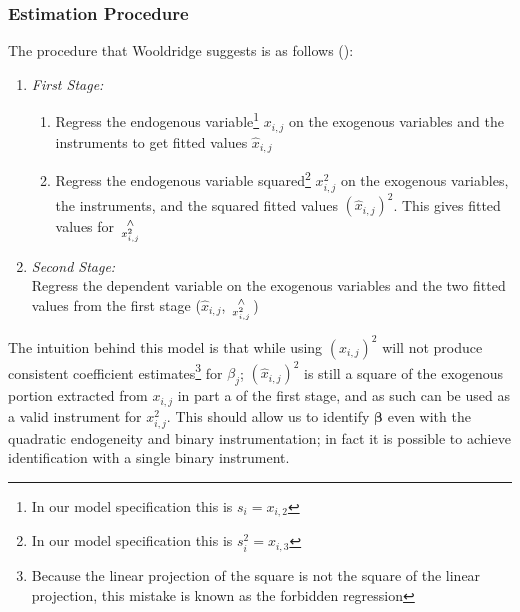 \documentclass[12pt]{article}
\begin{document}
\subsubsection{Estimation Procedure} \label{procedure}
The procedure that Wooldridge suggests is as follows (\cite{wooldridge}):
\begin{spacing}{1}
\begin{enumerate}[label={(\arabic*)}]
	\item \textit{First Stage:}
	\begin{enumerate}
		\item Regress the endogenous variable\footnote{In our model specification this is $s_i = x_{i,2}$} $x_{i,j}$ on the exogenous variables and the instruments to get fitted values $\hat{x}_{i,j}$
		\item Regress the endogenous variable squared\footnote{In our model specification this is $s_i^2 = x_{i,3}$} $x_{i,j}^2$ on the exogenous variables, the instruments, and the squared fitted values $(\hat{x}_{i,j})^2$. This gives fitted values for ${\wedge \atop x_{i,j}^2}$ 
	\end{enumerate} 
	\item \textit{Second Stage:} \\
	Regress the dependent variable on the exogenous variables and the two fitted values from the first stage ($\hat{x}_{i,j}$, ${\wedge \atop x_{i,j}^2}$)
\end{enumerate}
\end{spacing}
\noindent The intuition behind this model is that while using $(\hat{x}_{i,j})^2$ will not produce consistent coefficient estimates\footnote{Because the linear projection of the square is not the square of the linear projection, this mistake is known as the forbidden regression} for $\beta_j$; $(\hat{x}_{i,j})^2$ is still a square of the exogenous portion extracted from $x_{i,j}$ in part a of the first stage, and as such can be used as a valid instrument for $x_{i,j}^2$. This should allow us to identify $\bm{\beta}$ even with the quadratic endogeneity and binary instrumentation; in fact it is possible to achieve identification with a single binary instrument.

\end{document}
